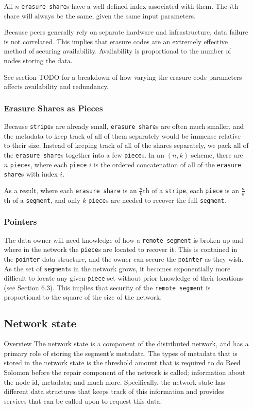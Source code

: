\documentclass[a4paper,10pt]{article}
\newcommand{\x}[1]{{\tt #1}}
\newcommand{\todo}[1]{{\color{red} TODO #1}}
\begin{document}
All $n$ \x{erasure share}s have a well defined index associated with them. The
$i$th share will always be the same, given the same input parameters.

Because peers generally rely on separate hardware and infrastructure, data
failure is not correlated. This implies that erasure codes are an extremely
effective method of securing availability. Availability is proportional to the
number of nodes storing the data.

See section \todo{} for a breakdown of how varying the erasure code parameters
affects availability and redundancy.

\subsubsection{Erasure Shares as Pieces}

Because \x{stripe}s are already small, \x{erasure share}s are often
much smaller, and the metadata to keep track of all of them separately would be
immense relative to their size. Instead of keeping track of all of the shares
separately, we pack all of the \x{erasure share}s together into a few
\x{piece}s. In an $(n, k)$ scheme, there are $n$ \x{piece}s, where each
\x{piece} $i$ is the ordered concatenation of all of the \x{erasure share}s
with index $i$.

As a result, where each \x{erasure share} is an $\frac{n}{k}$th of a \x{stripe},
each \x{piece} is an $\frac{n}{k}$th of a \x{segment}, and only $k$ \x{piece}s
are needed to recover the full \x{segment}.

\subsubsection{Pointers}

The data owner will need knowledge of how a \x{remote segment} is broken up and
where in the network the \x{piece}s are located to recover it. This is contained
in the \x{pointer} data structure, and the owner can secure the \x{pointer} as
they wish. As the set of \x{segment}s in the network grows, it becomes
exponentially more difficult to locate any given \x{piece} set without prior
knowledge of their locations (see Section 6.3). This implies that security of
the \x{remote segment} is proportional to the square of the size of the network.

\subsection{Network state}
Overview
The network state is a component of the distributed network, and has a primary role of storing the segment's metadata. The types of metadata that is stored in the network state is the threshold amount that is required to do Reed Solomon before the repair component of the network is called; information about the node id, metadata; and much more. Specifically, the network state has different data structures that keeps track of this information and provides services that can be called upon to request this data. 
\end{document}
